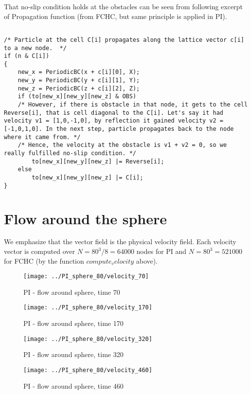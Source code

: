 That no-slip condition holds at the obstacles can be seen from following excerpt of Propagation function (from FCHC, but same principle is applied in PI).
\begin{lstlisting}

/* Particle at the cell C[i] propagates along the lattice vector c[i] to a new node.  */
if (n & C[i])
{
	new_x = PeriodicBC(x + c[i][0], X);
	new_y = PeriodicBC(y + c[i][1], Y);
	new_z = PeriodicBC(z + c[i][2], Z);
	if (to[new_x][new_y][new_z] & OBS)	
	/* However, if there is obstacle in that node, it gets to the cell Reverse[i], that is cell diagonal to the C[i]. Let's say it had velocity v1 = [1,0,-1,0], by reflection it gained velocity v2 = [-1,0,1,0]. In the next step, particle propagates back to the node where it came from. */
	/* Hence, the velocity at the obstacle is v1 + v2 = 0, so we really fulfilled no-slip condition. */	
		to[new_x][new_y][new_z] |= Reverse[i];
	else
		to[new_x][new_y][new_z] |= C[i];
}
\end{lstlisting}

\section{Flow around the sphere}

We emphasize that the vector field is the physical velocity field. 
Each velocity vector is computed over $N = 80^3 / 8 = 64000$ nodes for PI and $N = 80^3 = 521 000$ for FCHC (by the function $compute_velocity$ above).

\begin{figure}[htbp]
 \centering 
 \texttt{[image: ../PI\_sphere\_80/velocity\_70]}
 \label{transitions}
 \caption{PI - flow around sphere, time 70}
\end{figure}


\begin{figure}[htbp]
 \centering 
 \texttt{[image: ../PI\_sphere\_80/velocity\_170]}
 \label{transitions}
 \caption{PI - flow around sphere, time 170}
\end{figure}


\begin{figure}[htbp]
 \centering 
 \texttt{[image: ../PI\_sphere\_80/velocity\_320]}
 \label{transitions}
 \caption{PI - flow around sphere, time 320}
\end{figure}


\begin{figure}[htbp]
 \centering 
 \texttt{[image: ../PI\_sphere\_80/velocity\_460]}
 \label{transitions}
 \caption{PI - flow around sphere, time 460}
\end{figure}


